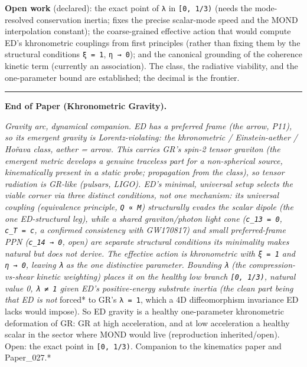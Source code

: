 \documentclass[
]{article}
\begin{document}
\textbf{Open work} (declared): the exact point of \texttt{λ} in
\texttt{{[}0,\ 1/3)} (needs the mode-resolved conservation inertia;
fixes the precise scalar-mode speed and the MOND interpolation
constant); the coarse-grained effective action that would compute ED's
khronometric couplings from first principles (rather than fixing them by
the structural conditions \texttt{ξ\ =\ 1}, \texttt{η\ →\ 0}); and the
canonical grounding of the coherence kinetic term (currently an
association). The class, the radiative viability, and the one-parameter
bound are established; the decimal is the frontier.

\begin{center}\rule{0.5\linewidth}{0.5pt}\end{center}

\textbf{End of Paper (Khronometric Gravity).}

\emph{Gravity arc, dynamical companion. ED has a preferred frame (the
arrow, P11), so its emergent gravity is Lorentz-violating: the
khronometric / Einstein-aether / Hořava class, aether = arrow. This
carries GR's spin-2 tensor graviton (the emergent metric develops a
genuine traceless part for a non-spherical source, kinematically present
in a static probe; propagation from the class), so tensor radiation is
GR-like (pulsars, LIGO). ED's minimal, universal setup selects the
viable corner via three distinct conditions, not one mechanism: its
universal coupling (equivalence principle, \texttt{Q\ ∝\ M})
structurally evades the scalar dipole (the one ED-structural leg), while
a shared graviton/photon light cone (\texttt{c\_13\ =\ 0},
\texttt{c\_T\ =\ c}, a confirmed consistency with GW170817) and small
preferred-frame PPN (\texttt{c\_14\ →\ 0}, open) are separate structural
conditions its minimality makes natural but does not derive. The
effective action is khronometric with \texttt{ξ\ =\ 1} and
\texttt{η\ →\ 0}, leaving \texttt{λ} as the one distinctive parameter.
Bounding \texttt{λ} (the compression-vs-shear kinetic weighting) places
it on the healthy low branch \texttt{{[}0,\ 1/3)}, natural value 0,
\texttt{λ\ ≠\ 1} given ED's positive-energy substrate inertia (the clean
part being that ED is not }forced* to GR's \texttt{λ\ =\ 1}, which a 4D
diffeomorphism invariance ED lacks would impose). So ED gravity is a
healthy one-parameter khronometric deformation of GR: GR at high
acceleration, and at low acceleration a healthy scalar in the sector
where MOND would live (reproduction inherited/open). Open: the exact
point in \texttt{{[}0,\ 1/3)}. Companion to the kinematics paper and
Paper\_027.*
\end{document}
